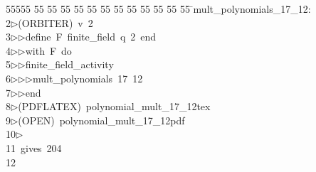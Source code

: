 %
%
\begin{tabbing}
55555 \= 55 \= 55 \= 55 \= 55 \= 55 \= 55 \= 55 \= 55 \= 55 \= 55 \= 55 \= 55 \= \>mult\_polynomials\_17\_12:\\[0pt]
2\>$\triangleright$\>(ORBITER)\ v\ 2\ \\[0pt]
3\>$\triangleright$\>$\triangleright$\>define\ F\ finite\_field\ q\ 2\ end\ \\[0pt]
4\>$\triangleright$\>$\triangleright$\>with\ F\ do\ \\[0pt]
5\>$\triangleright$\>$\triangleright$\>finite\_field\_activity\ \\[0pt]
6\>$\triangleright$\>$\triangleright$\>$\triangleright$\>mult\_polynomials\ 17\ 12\ \\[0pt]
7\>$\triangleright$\>$\triangleright$\>end\\[0pt]
8\>$\triangleright$\>(PDFLATEX)\ polynomial\_mult\_17\_12tex\\[0pt]
9\>$\triangleright$\>(OPEN)\ polynomial\_mult\_17\_12pdf\\[0pt]
10\>$\triangleright$\>\\[0pt]
11\>\ gives\ 204\\[0pt]
12\>\end{tabbing}
